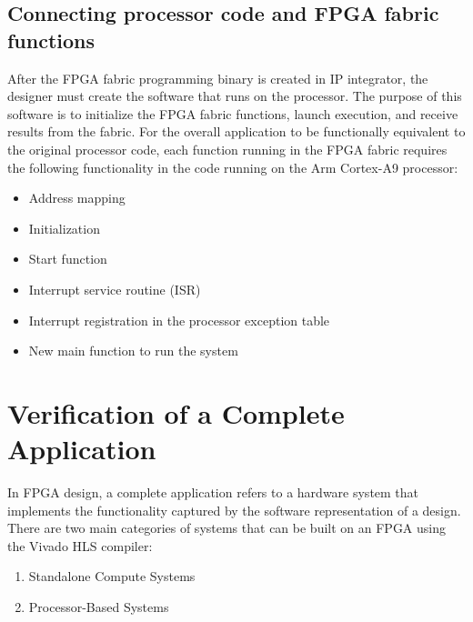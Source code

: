 \subsection{Connecting processor code and FPGA fabric functions}
After the FPGA fabric programming binary is created in IP integrator, the designer must
create the software that runs on the processor. The purpose of this software is to initialize
the FPGA fabric functions, launch execution, and receive results from the fabric. For the
overall application to be functionally equivalent to the original processor code, each
function running in the FPGA fabric requires the following functionality in the code running
on the Arm Cortex-A9 processor:

\begin{itemize}
  \item Address mapping
  \item Initialization
  \item Start function
  \item Interrupt service routine (ISR)
  \item Interrupt registration in the processor exception table
  \item New main function to run the system
\end{itemize}

\clearpage

\section{Verification of a Complete Application}

In FPGA design, a complete application refers to a hardware system that implements the
functionality captured by the software representation of a design. There are two main
categories of systems that can be built on an FPGA using the Vivado HLS compiler:
\begin{enumerate}                                      
  \item Standalone Compute Systems                                   
  \item Processor-Based Systems
\end{enumerate}

